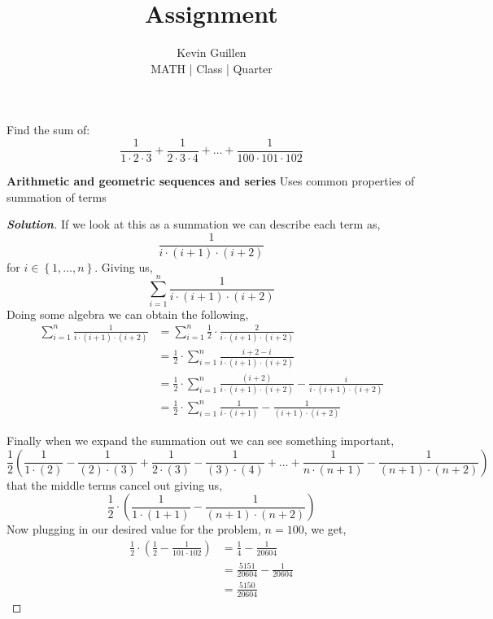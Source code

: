 \documentclass[11pt]{article}
\newenvironment{problem}[2][Problem\!]{\begin{trivlist}
\item[\hskip \labelsep {\bfseries #1}\hskip \labelsep {\bfseries #2}]}{\end{trivlist}}
\newenvironment{solution}{\begin{proof}[\textbf{\textit{Solution}}] }{\end{proof}}
\newcommand{\set}[1]{\left\{#1\right\}} %
\begin{document}
 
\title{Assignment}
\author{Kevin Guillen\\[0.5em]
MATH  | Class | Quarter}
\date{} 
\maketitle
\begin{tcolorbox}
    \begin{problem}{1}
    Find the sum of:
    \[\frac{1}{1 \cdot 2\cdot 3} + \frac{1}{2 \cdot 3 \cdot 4} + \dots + \frac{1}{100 \cdot 101 \cdot 102}\]
    \end{problem}
    \textbf{Arithmetic and geometric sequences and series} Uses common properties of summation of terms 
\end{tcolorbox}
\begin{solution}
    If we look at this as a summation we can describe each term as, 
    \[\frac{1}{i \cdot (i +1) \cdot (i+2)} \] 
    for $i\in \set{1, \dots, n}$. Giving us,
    \[\sum_{i=1}^n \frac{1}{i \cdot (i +1) \cdot (i+2)}\]
    Doing some algebra we can obtain the following,
    \begin{align*}
        \sum_{i=1}^n \frac{1}{i \cdot (i +1) \cdot (i+2)} &= \sum_{i=1}^n \frac{1}{2}\cdot \frac{2}{i \cdot (i +1) \cdot (i+2)} \\
        &= \frac{1}{2} \cdot \sum_{i=1}^n \frac{i + 2 - i}{i \cdot (i +1) \cdot (i+2)} \\
        &= \frac{1}{2} \cdot\sum_{i=1}^n  \frac{(i + 2)}{i \cdot (i +1) \cdot (i+2)} - \frac{i}{i \cdot (i +1) \cdot (i+2)} \\
        &= \frac{1}{2} \cdot\sum_{i=1}^n  \frac{1}{i \cdot (i +1)} - \frac{1}{(i +1) \cdot (i+2)}
    \end{align*}
    
    \noindent Finally when we expand the summation out we can see something important,
    \[\frac{1}{2}\left(\frac{1}{1 \cdot (2)} - \frac{1}{(2)\cdot(3)} + \frac{1}{2\cdot(3)} - \frac{1}{(3)\cdot(4)}+ \dots + \frac{1}{n \cdot(n+1)}-\frac{1}{(n +1)\cdot(n + 2)}\right)\]
    that the middle terms cancel out giving us,
    \[\frac{1}{2} \cdot \left(\frac{1}{1\cdot(1+1)} - \frac{1}{(n+1)\cdot(n+2)}\right)\]
    Now plugging in our desired value for the problem, $n = 100$, we get,
    \begin{align*}
        \frac{1}{2} \cdot \left(\frac{1}{2} - \frac{1}{101 \cdot 102} \right) &= \frac{1}{4} - \frac{1}{20604} \\ 
        &= \frac{5151}{20604} - \frac{1}{20604}  \\
        &= \frac{5150}{20604}
    \end{align*}
\end{solution}
\end{document}
